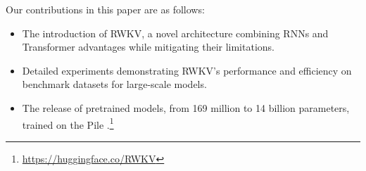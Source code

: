 \documentclass[11pt]{article}
\begin{document}
Our contributions in this paper are as follows:
\begin{itemize}
 \item The introduction of RWKV, a novel architecture combining RNNs and Transformer advantages while mitigating their limitations.
 \item Detailed experiments demonstrating RWKV's performance and efficiency on benchmark datasets for large-scale models. %
 \item The release of pretrained models, from 169 million to 14 billion parameters, trained on the Pile \cite{gao2020pile,biderman2022datasheet}.\footnote{\href{https://huggingface.co/RWKV}{https://huggingface.co/RWKV}}
\end{itemize}






\end{document}
